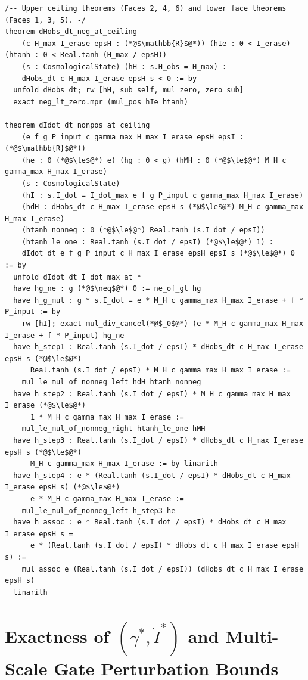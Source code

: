 \documentclass[11pt,a4paper]{article}
\theoremstyle{remark}
\begin{document}
\begin{lstlisting}[language=Lean4]
/-- Upper ceiling theorems (Faces 2, 4, 6) and lower face theorems (Faces 1, 3, 5). -/
theorem dHobs_dt_neg_at_ceiling
    (c H_max I_erase epsH : (*@$\mathbb{R}$@*)) (hIe : 0 < I_erase) (htanh : 0 < Real.tanh (H_max / epsH))
    (s : CosmologicalState) (hH : s.H_obs = H_max) :
    dHobs_dt c H_max I_erase epsH s < 0 := by
  unfold dHobs_dt; rw [hH, sub_self, mul_zero, zero_sub]
  exact neg_lt_zero.mpr (mul_pos hIe htanh)

theorem dIdot_dt_nonpos_at_ceiling
    (e f g P_input c gamma_max H_max I_erase epsH epsI : (*@$\mathbb{R}$@*))
    (he : 0 (*@$\le$@*) e) (hg : 0 < g) (hMH : 0 (*@$\le$@*) M_H c gamma_max H_max I_erase)
    (s : CosmologicalState)
    (hI : s.I_dot = I_dot_max e f g P_input c gamma_max H_max I_erase)
    (hdH : dHobs_dt c H_max I_erase epsH s (*@$\le$@*) M_H c gamma_max H_max I_erase)
    (htanh_nonneg : 0 (*@$\le$@*) Real.tanh (s.I_dot / epsI))
    (htanh_le_one : Real.tanh (s.I_dot / epsI) (*@$\le$@*) 1) :
    dIdot_dt e f g P_input c H_max I_erase epsH epsI s (*@$\le$@*) 0 := by
  unfold dIdot_dt I_dot_max at *
  have hg_ne : g (*@$\neq$@*) 0 := ne_of_gt hg
  have h_g_mul : g * s.I_dot = e * M_H c gamma_max H_max I_erase + f * P_input := by
    rw [hI]; exact mul_div_cancel(*@$_0$@*) (e * M_H c gamma_max H_max I_erase + f * P_input) hg_ne
  have h_step1 : Real.tanh (s.I_dot / epsI) * dHobs_dt c H_max I_erase epsH s (*@$\le$@*)
      Real.tanh (s.I_dot / epsI) * M_H c gamma_max H_max I_erase :=
    mul_le_mul_of_nonneg_left hdH htanh_nonneg
  have h_step2 : Real.tanh (s.I_dot / epsI) * M_H c gamma_max H_max I_erase (*@$\le$@*)
      1 * M_H c gamma_max H_max I_erase :=
    mul_le_mul_of_nonneg_right htanh_le_one hMH
  have h_step3 : Real.tanh (s.I_dot / epsI) * dHobs_dt c H_max I_erase epsH s (*@$\le$@*)
      M_H c gamma_max H_max I_erase := by linarith
  have h_step4 : e * (Real.tanh (s.I_dot / epsI) * dHobs_dt c H_max I_erase epsH s) (*@$\le$@*)
      e * M_H c gamma_max H_max I_erase :=
    mul_le_mul_of_nonneg_left h_step3 he
  have h_assoc : e * Real.tanh (s.I_dot / epsI) * dHobs_dt c H_max I_erase epsH s =
      e * (Real.tanh (s.I_dot / epsI) * dHobs_dt c H_max I_erase epsH s) :=
    mul_assoc e (Real.tanh (s.I_dot / epsI)) (dHobs_dt c H_max I_erase epsH s)
  linarith
\end{lstlisting}

\section{Exactness of $(\gamma^*,\dot{I}^*)$ and Multi-Scale Gate Perturbation Bounds}
\end{document}
